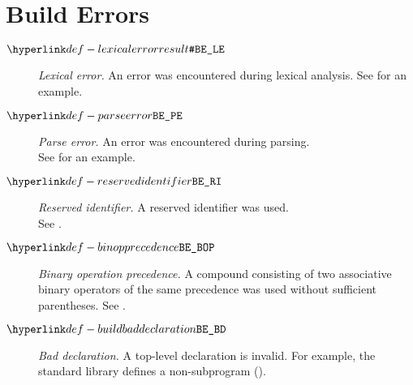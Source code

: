 \section{Build Errors\label{sec:BuildErrors}}
\begin{description}
  \item[$\LexicalError$]
    \textit{Lexical error.}
    An error was encountered during lexical analysis.
    See  for an example.

  \item[$\ParseError$]
    \textit{Parse error.}
    An error was encountered during parsing. \\
    See  for an example.

  \hypertarget{def-reservedidentifier}{}
  \item[$\ReservedIdentifier$]
    \textit{Reserved identifier.}
    A reserved identifier was used. \\
    See .

  \hypertarget{def-binopprecedence}{}
  \item[$\BinopPrecedence$]
    \textit{Binary operation precedence.}
    A compound \binopexpressionterm{} consisting of two associative binary operators of the same precedence was used without sufficient parentheses.
    See .

  \hypertarget{def-buildbaddeclaration}{}
  \item[$\BuildBadDeclaration$]
    \textit{Bad declaration.}
    A top-level declaration is invalid.
    For example, the standard library defines a non-subprogram ().
\end{description}

